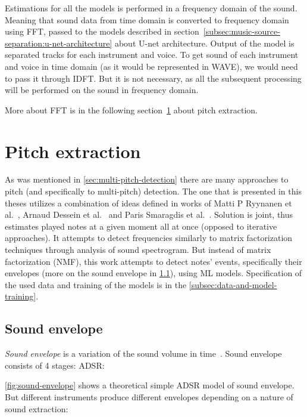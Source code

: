 Estimations for all the models is performed in a frequency domain of the sound. Meaning that sound data from time domain
is converted to frequency domain using \ac{FFT}, passed to the models described in section~\ref{subsec:music-source-separation:u-net-architecture}
about U-net architecture. Output of the model is separated tracks for each instrument and voice. To get sound of each
instrument and voice in time domain (as it would be represented in \ac{WAVE}), we would need to pass it through
\ac{IDFT}. But it is not necessary, as all the subsequent processing will be performed on the sound in frequency domain.

More about \ac{FFT} is in the following section~\ref{sec:pitch-extraction} about pitch extraction.

\section{Pitch extraction}\label{sec:pitch-extraction}
As was mentioned in \cref{sec:multi-pitch-detection} there are many approaches to pitch (and specifically
to multi-pitch) detection. The one that is presented in this theses utilizes a combination of ideas defined in works
of Matti P Ryynanen et al.~\cite{ryynanen2005polyphonic}, Arnaud Dessein et al.~\cite{dessein2010real} and Paris Smaragdis
et al.~\cite{smaragdis2003non}. Solution is joint, thus estimates played notes at a given moment all at once (opposed to
iterative approaches). It attempts to detect frequencies similarly to matrix factorization techniques through analysis
of sound spectrogram. But instead of matrix factorization (\ac{NMF}), this work attempts to detect notes' events,
specifically their envelopes (more on the sound envelope in \cref{subsec:sound-envelope}), using \ac{ML} models.
Specification of the used data and training of the models is in the \cref{subsec:data-and-model-training}.

\pagebreak

\subsection{Sound envelope}\label{subsec:sound-envelope}
\textit{Sound envelope} is a variation of the sound volume in time~\cite{dregvaite2015information}. Sound envelope
consists of 4 stages: \ac{ADSR}:


\cref{fig:sound-envelope} shows a theoretical simple \ac{ADSR} model of sound envelope. But different instruments
produce different envelopes depending on a nature of sound extraction:

